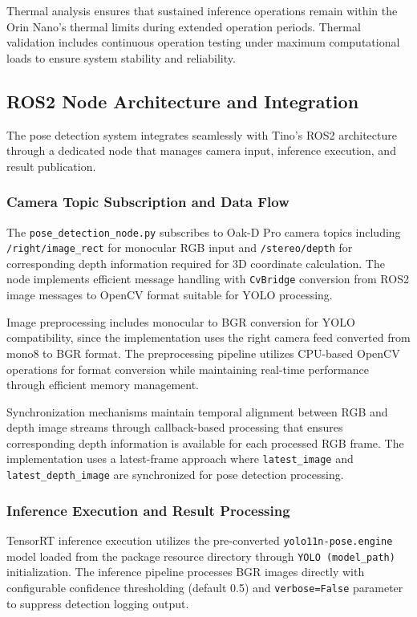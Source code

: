 Thermal analysis ensures that sustained inference operations remain within the Orin Nano's thermal limits during extended operation periods. Thermal validation includes continuous operation testing under maximum computational loads to ensure system stability and reliability.

\subsection{ROS2 Node Architecture and Integration}

The pose detection system integrates seamlessly with Tino's ROS2 architecture through a dedicated node that manages camera input, inference execution, and result publication.

\subsubsection{Camera Topic Subscription and Data Flow}

The \texttt{pose\_detection\_node.py} subscribes to Oak-D Pro camera topics including \texttt{/right/image\_rect} for monocular RGB input and \texttt{/stereo/depth} for corresponding depth information required for 3D coordinate calculation. The node implements efficient message handling with \texttt{CvBridge} conversion from ROS2 image messages to OpenCV format suitable for YOLO processing.

Image preprocessing includes monocular to BGR conversion for YOLO compatibility, since the implementation uses the right camera feed converted from mono8 to BGR format. The preprocessing pipeline utilizes CPU-based OpenCV operations for format conversion while maintaining real-time performance through efficient memory management.

Synchronization mechanisms maintain temporal alignment between RGB and depth image streams through callback-based processing that ensures corresponding depth information is available for each processed RGB frame. The implementation uses a latest-frame approach where \texttt{latest\_image} and \texttt{latest\_depth\_image} are synchronized for pose detection processing.

\subsubsection{Inference Execution and Result Processing}

TensorRT inference execution utilizes the pre-converted \texttt{yolo11n-pose.engine} model loaded from the package resource directory through \texttt{YOLO (model\_path)} initialization. The inference pipeline processes BGR images directly with configurable confidence thresholding (default 0.5) and \texttt{verbose=False} parameter to suppress detection logging output.

